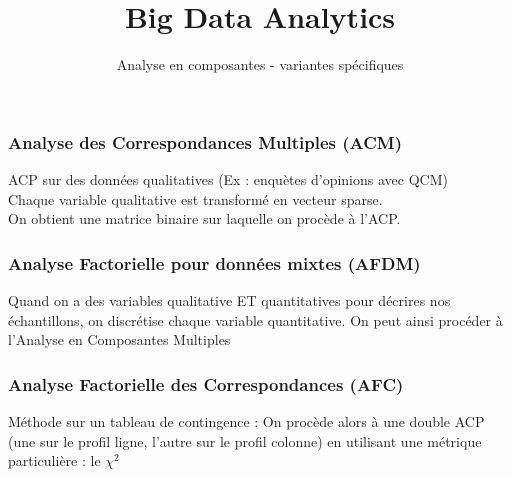 \documentclass{formation}
\title{Big Data Analytics}
\subtitle{Analyse en composantes - variantes spécifiques}
\begin{document}
\maketitle

\begin{frame}
  \frametitle{Analyse des Correspondances Multiples (ACM)}
  ACP sur des données qualitatives (Ex : enquètes d'opinions avec QCM) \\
  Chaque variable qualitative est transformé en vecteur sparse. \\
  On obtient une matrice binaire sur laquelle on procède à l'ACP.\\
\end{frame}

\begin{frame}
  \frametitle{Analyse Factorielle pour données mixtes (AFDM)}
  Quand on a des variables qualitative ET quantitatives pour décrires nos échantillons, on discrétise chaque variable quantitative. On peut ainsi procéder à l'Analyse en Composantes Multiples
\end{frame}

\begin{frame}
  \frametitle{Analyse Factorielle des Correspondances (AFC)}
  Méthode sur un tableau de contingence :
  On procède alors à une double ACP (une sur le profil ligne, l'autre sur le profil colonne) en utilisant une métrique particulière : le $\chi^2$
\end{frame}
\end{document}
